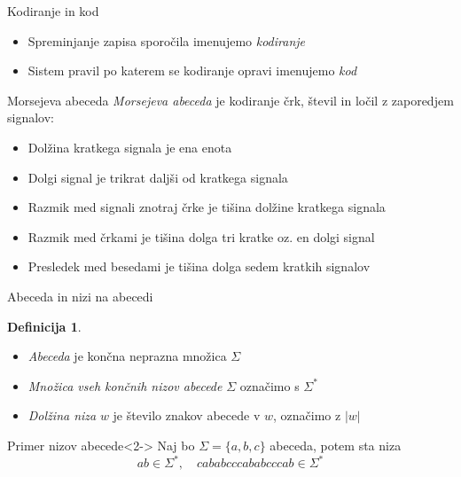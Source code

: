 \documentclass{beamer}
\theoremstyle{definition} %
\newtheorem{definicija}{Definicija}[section]
\begin{document}
\begin{frame}{Kodiranje in kod}
    \begin{itemize}
        \item<1-> Spreminjanje zapisa sporočila imenujemo \textit{kodiranje}
        \item<2-> Sistem pravil po katerem se kodiranje opravi imenujemo \textit{kod}
    \end{itemize}
\end{frame}

\begin{frame}{Morsejeva abeceda}
    \textit{Morsejeva abeceda} je kodiranje črk, števil in ločil z zaporedjem signalov:
    \begin{itemize}
        \item<2-> Dolžina kratkega signala je ena enota
        \item<3-> Dolgi signal je trikrat daljši od kratkega signala
        \item<4-> Razmik med signali znotraj črke je tišina dolžine kratkega signala
        \item<5-> Razmik med črkami je tišina dolga tri kratke oz. en dolgi signal
        \item<6-> Presledek med besedami je tišina dolga sedem kratkih signalov
    \end{itemize}
\end{frame}

\begin{frame}{Abeceda in nizi na abecedi}
    \begin{definicija}
        \begin{itemize}
            \item \textit{Abeceda} je končna neprazna množica $ \Sigma $
            \item \textit{Množica vseh končnih nizov abecede} $ \Sigma $ označimo s $ \Sigma^* $
            \item \textit{Dolžina niza} $ w $ je število znakov abecede v $ w $, označimo z $ |w| $
        \end{itemize}
    \end{definicija}    
    \begin{exampleblock}{Primer nizov abecede}<2->
    Naj bo $ \Sigma = \{ a,b,c \} $ abeceda, potem sta niza
    \[ 
        ab \in \Sigma^* , \quad cababcccababcccab \in \Sigma^*
    \]
    \end{exampleblock}
\end{frame}
\end{document}
